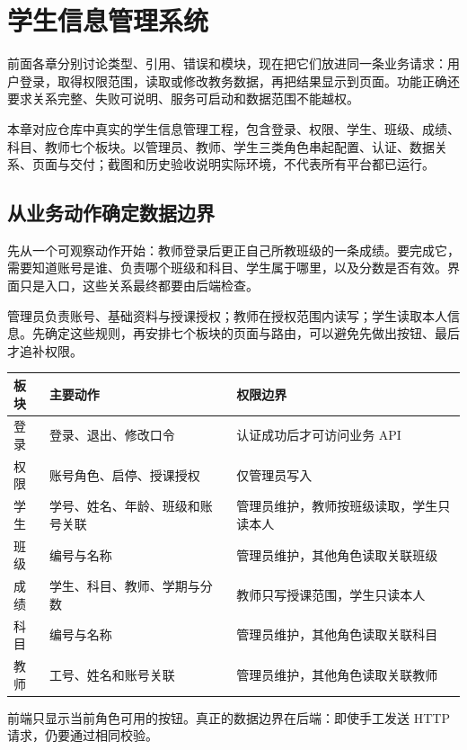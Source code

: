 \chapter{学生信息管理系统}
\label{ch:25}

前面各章分别讨论类型、引用、错误和模块，现在把它们放进同一条业务请求：用户登录，取得权限范围，读取或修改教务数据，再把结果显示到页面。功能正确还要求关系完整、失败可说明、服务可启动和数据范围不能越权。

本章对应仓库中真实的学生信息管理工程，包含登录、权限、学生、班级、成绩、科目、教师七个板块。以管理员、教师、学生三类角色串起配置、认证、数据关系、页面与交付；截图和历史验收说明实际环境，不代表所有平台都已运行。

\section{从业务动作确定数据边界}

先从一个可观察动作开始：教师登录后更正自己所教班级的一条成绩。要完成它，需要知道账号是谁、负责哪个班级和科目、学生属于哪里，以及分数是否有效。界面只是入口，这些关系最终都要由后端检查。

管理员负责账号、基础资料与授课授权；教师在授权范围内读写；学生读取本人信息。先确定这些规则，再安排七个板块的页面与路由，可以避免先做出按钮、最后才追补权限。

\begin{center}
\begin{tabular}{lll}
\toprule
板块 & 主要动作 & 权限边界 \\
\midrule
登录 & 登录、退出、修改口令 & 认证成功后才可访问业务 API \\
权限 & 账号角色、启停、授课授权 & 仅管理员写入 \\
学生 & 学号、姓名、年龄、班级和账号关联 & 管理员维护，教师按班级读取，学生只读本人 \\
班级 & 编号与名称 & 管理员维护，其他角色读取关联班级 \\
成绩 & 学生、科目、教师、学期与分数 & 教师只写授课范围，学生只读本人 \\
科目 & 编号与名称 & 管理员维护，其他角色读取关联科目 \\
教师 & 工号、姓名和账号关联 & 管理员维护，其他角色读取关联教师 \\
\bottomrule
\end{tabular}
\end{center}

前端只显示当前角色可用的按钮。真正的数据边界在后端：即使手工发送 HTTP 请求，仍要通过相同校验。

